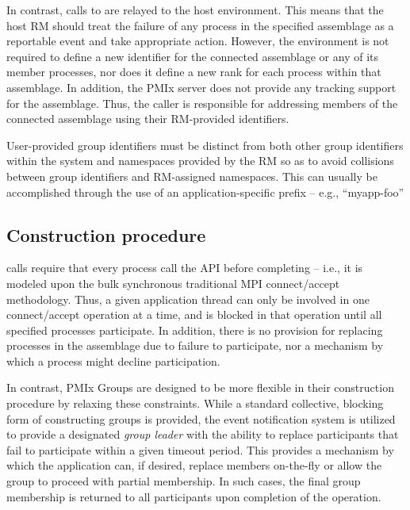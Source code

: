 In contrast, calls to  are relayed to the host environment. This means that the host \ac{RM} should treat the failure of any process in the specified assemblage as a reportable event and take appropriate action. However, the environment is not required to define a new identifier for the connected assemblage or any of its member processes, nor does it define a new rank for each process within that assemblage. In addition, the \ac{PMIx} server does not provide any tracking support for the assemblage. Thus, the caller is responsible for addressing members of the connected assemblage using their \ac{RM}-provided identifiers.

\adviceuserstart
User-provided group identifiers must be distinct from both other group identifiers within the system and namespaces provided by the \ac{RM} so as to avoid collisions between group identifiers and \ac{RM}-assigned namespaces. This can usually be accomplished through the use of an application-specific prefix – e.g., ``myapp-foo''
\adviceuserend


\subsection{Construction procedure}

 calls require that every process call the \ac{API} before completing – i.e., it is modeled upon the bulk synchronous traditional \ac{MPI} connect/accept methodology. Thus, a given application thread can only be involved in one connect/accept operation at a time, and is blocked in that operation until all specified processes participate. In addition, there is no provision for replacing processes in the assemblage due to failure to participate, nor a mechanism by which a process might decline participation.

In contrast, \ac{PMIx} Groups are designed to be more flexible in their construction procedure by relaxing these constraints. While a standard collective, blocking form of constructing groups is provided, the event notification system is utilized to provide a designated \emph{group leader} with the ability to replace participants that fail to participate within a given timeout period. This provides a mechanism by which the application can, if desired, replace members on-the-fly or allow the group to proceed with partial membership. In such cases, the final group membership is returned to all participants upon completion of the operation.


